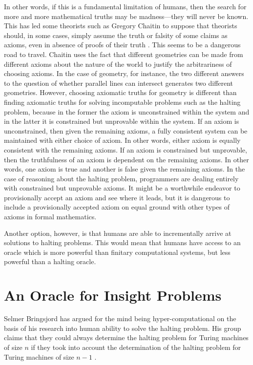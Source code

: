 In other words, if this is a fundamental limitation of humans, then the search for more and more mathematical truths may be madness---they will never be known.  This has led some theorists such as Gregory Chaitin to suppose that theorists should, in some cases, simply assume the truth or falsity of some claims as axioms, even in absence of proofs of their truth \citep{chaitin2006}.  This seems to be a dangerous road to travel.  Chaitin uses the fact that different geometries can be made from different axioms about the nature of the world to justify the arbitrariness of choosing axioms.  In the case of geometry, for instance, the two different answers to the question of whether parallel lines can intersect generates two different geometries.  However, choosing axiomatic truths for geometry is different than finding axiomatic truths for solving incomputable problems such as the halting problem, because in the former the axiom is unconstrained within the system and in the latter it is constrained but unprovable within the system.  If an axiom is unconstrained, then given the remaining axioms, a fully consistent system can be maintained with either choice of axiom.  In other words, either axiom is equally consistent with the remaining axioms.  If an axiom is constrained but unprovable, then the truthfulness of an axiom is dependent on the remaining axioms.  In other words, one axiom is true and another is false given the remaining axioms.  In the case of reasoning about the halting problem, programmers are dealing entirely with constrained but unprovable axioms.  It might be a worthwhile endeavor to provisionally accept an axiom and see where it leads, but it is dangerous to include a provisionally accepted axiom on equal ground with other types of axioms in formal mathematics.

Another option, however, is that humans are able to incrementally arrive at solutions to halting problems.  This would mean that humans have access to an oracle which is more powerful than finitary computational systems, but less powerful than a halting oracle.

\section{An Oracle for Insight Problems}
Selmer Bringsjord has argued for the mind being hyper-computational on the basis of his research into human ability to solve the halting problem.  His group claims that they could always determine the halting problem for Turing machines of size $n$ if they took into account the determination of the halting problem for Turing machines of size $n - 1$ .

